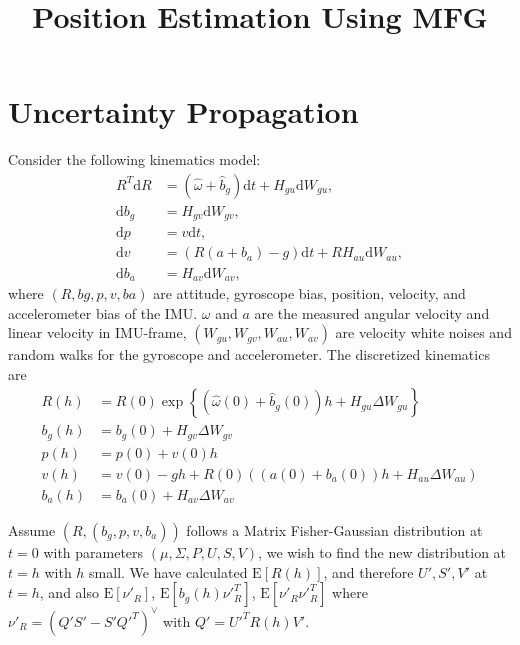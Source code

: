 \documentclass[10pt]{article}
\title{\vspace{-4ex}\textbf{Position Estimation Using MFG\vspace{-4ex}}}
\date{}
\newcommand{\expect}[1]{\ensuremath{\mathrm{E}\left[ #1 \right]}}
\newcommand{\diff}[1]{\ensuremath{\mathrm{d} #1}}
\begin{document}
\maketitle

\section{Uncertainty Propagation}

Consider the following kinematics model:
\begin{align}
	R^T\diff{R} &= (\hat{\omega}+\hat{b}_g)\diff{t} + H_{gu}\diff{W_{gu}}, \\
	\diff{b_g} &= H_{gv}\diff{W_{gv}}, \\
	\diff{p} &= v\diff{t}, \\
	\diff{v} &= (R(a+b_a)-g)\diff{t} + RH_{au}\diff{W_{au}}, \\
	\diff{b_a} &= H_{av}\diff{W_{av}},
\end{align}
where $(R,bg,p,v,ba)$ are attitude, gyroscope bias, position, velocity, and accelerometer bias of the IMU.
$\omega$ and $a$ are the measured angular velocity and linear velocity in IMU-frame, $(W_{gu},W_{gv},W_{au},W_{av})$ are velocity white noises and random walks for the gyroscope and accelerometer.
The discretized kinematics are
\begin{align}
	R(h) &= R(0)\exp\left\{ (\hat{\omega}(0) + \hat{b}_g(0))h + H_{gu}\Delta W_{gu} \right\} \\
	b_g(h) &= b_g(0) + H_{gv}\Delta W_{gv} \\
	p(h) &= p(0) + v(0)h \\
	v(h) &= v(0)-gh + R(0)\left( (a(0)+b_a(0))h + H_{au}\Delta W_{au} \right)\\
	b_a(h) &= b_a(0) + H_{av}\Delta W_{av}
\end{align}

Assume $(R,(b_g,p,v,b_a))$ follows a Matrix Fisher-Gaussian distribution at $t=0$ with parameters $(\mu,\Sigma,P,U,S,V)$, we wish to find the new distribution at $t=h$ with $h$ small.
We have calculated $\expect{R(h)}$, and therefore $U',S',V'$ at $t=h$, and also $\expect{\nu'_R}$, $\expect{b_g(h)\nu'^T_R}$, $\expect{\nu'_R\nu'^T_R}$ where $\nu'_R = (Q'S'-S'Q'^T)^\vee$ with $Q' = U'^TR(h)V'$.
\end{document}
